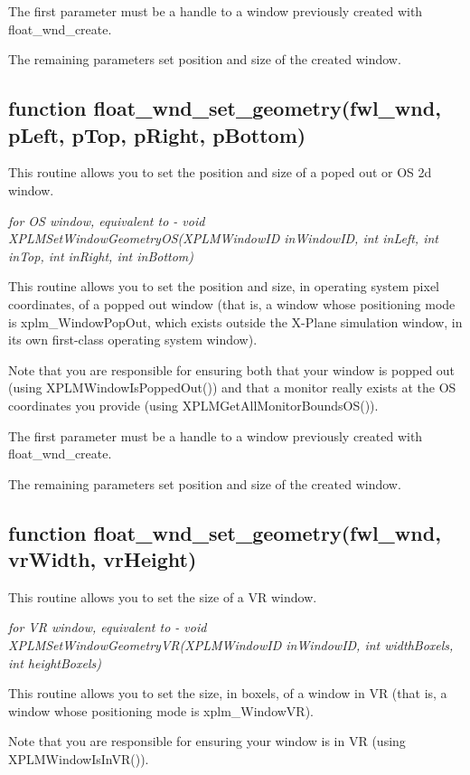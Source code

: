 \documentclass[11pt,parskip=half,a4paper]{scrartcl}
\begin{document}
The first parameter must be a handle to a window previously created with float\_wnd\_create.

The remaining parameters set position and size of the created window.

\subsection{\hspace*{1.0mm}function float\_wnd\_set\_geometry(fwl\_wnd, pLeft, pTop, pRight, pBottom)}

This routine allows you to set the position and size of a poped out or OS 2d window.

\emph{for OS window, equivalent to       - void XPLMSetWindowGeometryOS(XPLMWindowID inWindowID, int inLeft, int inTop, int inRight, int inBottom)}

This routine allows you to set the position and size, in operating system pixel coordinates, of a popped out window (that is, a window whose positioning mode is xplm\_WindowPopOut, which exists outside the X-Plane simulation window, in its own first-class operating system window).

Note that you are responsible for ensuring both that your window is popped out (using XPLMWindowIsPoppedOut()) and that a monitor really exists at the OS coordinates you provide (using XPLMGetAllMonitorBoundsOS()).

The first parameter must be a handle to a window previously created with float\_wnd\_create.

The remaining parameters set position and size of the created window.

\newpage

\subsection{\hspace*{1.0mm}function float\_wnd\_set\_geometry(fwl\_wnd, vrWidth, vrHeight)}

This routine allows you to set the size of a VR window.

\emph{for VR window, equivalent to       - void XPLMSetWindowGeometryVR(XPLMWindowID inWindowID, int widthBoxels, int heightBoxels)}

This routine allows you to set the size, in boxels, of a window in VR (that is, a window whose positioning mode is xplm\_WindowVR).

Note that you are responsible for ensuring your window is in VR (using XPLMWindowIsInVR()).
\end{document}
